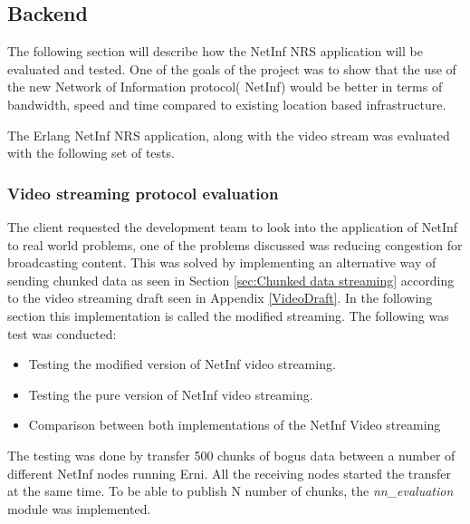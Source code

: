 \subsection{Backend}

The following section will describe how the NetInf NRS application will be evaluated and tested. One of the goals of the project was to show that the use of the new Network of Information protocol( NetInf) would be better in terms of bandwidth, speed and time compared to existing location based infrastructure. 

The Erlang NetInf NRS application, along with the video stream was evaluated with the following set of tests. 


\subsubsection{Video streaming protocol evaluation}
The client requested the development team to look into the application of NetInf to real world problems, one of the problems discussed was reducing congestion for broadcasting content. This was solved by implementing an alternative way of sending chunked data as seen in Section \ref{sec:Chunked data streaming} according to the video streaming draft seen in Appendix \ref{VideoDraft}. In the following section this implementation is called the modified streaming. The following was test was conducted:

\begin{itemize}
\item Testing the modified version of NetInf video streaming. 
\item Testing the pure version of NetInf video streaming.
\item Comparison between both implementations of the NetInf Video streaming
\end{itemize}

The testing was done by transfer 500 chunks of bogus data between a number of different NetInf nodes running Erni. All the receiving nodes started the transfer at the same time. To be able to publish N number of chunks, the \textit{nn\_evaluation} module was implemented.


